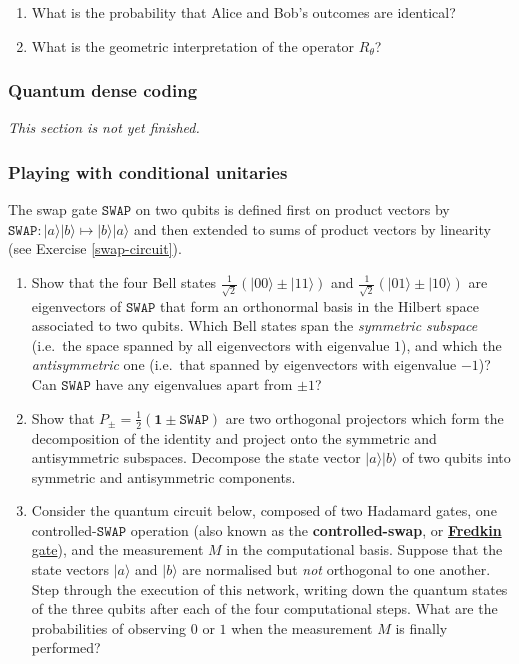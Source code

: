 \documentclass[fleqn,a4paper]{article}
\newenvironment{todo}{\color{primary}\emph{This section is not yet finished.}}{}
\theoremstyle{definition}
\theoremstyle{definition}
\theoremstyle{definition}
\theoremstyle{definition}
\theoremstyle{remark}
\begin{document}
\begin{enumerate}
\def\labelenumi{\arabic{enumi}.}
\setcounter{enumi}{2}
\item
  What is the probability that Alice and Bob's outcomes are identical?
\item
  What is the geometric interpretation of the operator \(R_\theta\)?
\end{enumerate}

\hypertarget{quantum-dense-coding}{%
\subsubsection{Quantum dense coding}\label{quantum-dense-coding}}

\begin{todo}

\end{todo}

\hypertarget{playing-with-conditional-unitaries}{%
\subsubsection{Playing with conditional unitaries}\label{playing-with-conditional-unitaries}}

The swap gate \(\texttt{SWAP}\) on two qubits is defined first on product vectors by \(\texttt{SWAP}\colon|a\rangle|b\rangle\mapsto|b\rangle|a\rangle\) and then extended to sums of product vectors by linearity (see Exercise \ref{swap-circuit}).

\begin{enumerate}
\def\labelenumi{\arabic{enumi}.}
\item
  Show that the four Bell states \(\frac{1}{\sqrt{2}}(|00\rangle\pm|11\rangle)\) and \(\frac{1}{\sqrt{2}}(|01\rangle\pm|10\rangle)\) are eigenvectors of \(\texttt{SWAP}\) that form an orthonormal basis in the Hilbert space associated to two qubits.
  Which Bell states span the \emph{symmetric subspace} (i.e.~the space spanned by all eigenvectors with eigenvalue \(1\)), and which the \emph{antisymmetric} one (i.e.~that spanned by eigenvectors with eigenvalue \(-1\))?
  Can \(\texttt{SWAP}\) have any eigenvalues apart from \(\pm1\)?
\item
  Show that \(P_\pm = \frac{1}{2}(\mathbf{1}\pm \texttt{SWAP})\) are two orthogonal projectors which form the decomposition of the identity and project onto the symmetric and antisymmetric subspaces.
  Decompose the state vector \(|a\rangle|b\rangle\) of two qubits into symmetric and antisymmetric components.
\item
  Consider the quantum circuit below, composed of two Hadamard gates, one controlled-\(\texttt{SWAP}\) operation (also known as the \textbf{controlled-swap}, or \href{https://en.wikipedia.org/wiki/Fredkin_gate}{\textbf{Fredkin} gate}), and the measurement \(M\) in the computational basis.
  Suppose that the state vectors \(|a\rangle\) and \(|b\rangle\) are normalised but \emph{not} orthogonal to one another.
  Step through the execution of this network, writing down the quantum states of the three qubits after each of the four computational steps.
  What are the probabilities of observing \(0\) or \(1\) when the measurement \(M\) is finally performed?
\end{enumerate}
\end{document}
